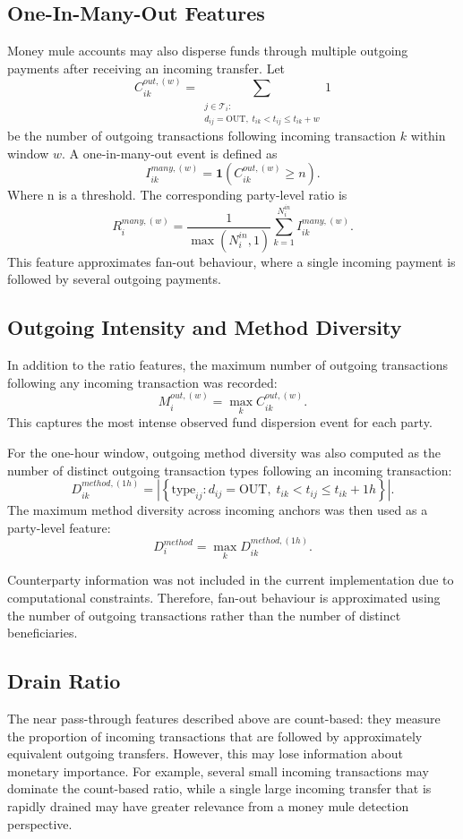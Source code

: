 \subsection{One-In-Many-Out Features}

Money mule accounts may also disperse funds through multiple outgoing payments after receiving an incoming transfer. Let
\[
C_{ik}^{out,(w)}
=
\sum_{\substack{j \in \mathcal{T}_i:\\
d_{ij}=\mathrm{OUT},\;
t_{ik}<t_{ij}\leq t_{ik}+w}}
1
\]
be the number of outgoing transactions following incoming transaction \(k\) within window \(w\). A one-in-many-out event is defined as
\[
I_{ik}^{many,(w)}
=
\mathbf{1}\left(C_{ik}^{out,(w)} \geq n\right).
\]
Where n is a threshold. The corresponding party-level ratio is
\[
R_i^{many,(w)}
=
\frac{1}{\max(N_i^{in},1)}
\sum_{k=1}^{N_i^{in}}
I_{ik}^{many,(w)}.
\]
This feature approximates fan-out behaviour, where a single incoming payment is followed by several outgoing payments.

\subsection{Outgoing Intensity and Method Diversity}

In addition to the ratio features, the maximum number of outgoing transactions following any incoming transaction was recorded:
\[
M_i^{out,(w)}
=
\max_k C_{ik}^{out,(w)}.
\]
This captures the most intense observed fund dispersion event for each party.

For the one-hour window, outgoing method diversity was also computed as the number of distinct outgoing transaction types following an incoming transaction:
\[
D_{ik}^{method,(1h)}
=
\left|
\left\{
\mathrm{type}_{ij}:
d_{ij}=\mathrm{OUT},
\;
t_{ik}<t_{ij}\leq t_{ik}+1h
\right\}
\right|.
\]
The maximum method diversity across incoming anchors was then used as a party-level feature:
\[
D_i^{method}
=
\max_k D_{ik}^{method,(1h)}.
\]

Counterparty information was not included in the current implementation due to computational constraints. Therefore, fan-out behaviour is approximated using the number of outgoing transactions rather than the number of distinct beneficiaries.
\subsection{Drain Ratio}

The near pass-through features described above are count-based: they measure the proportion of incoming transactions that are followed by approximately equivalent outgoing transfers. However, this may lose information about monetary importance. For example, several small incoming transactions may dominate the count-based ratio, while a single large incoming transfer that is rapidly drained may have greater relevance from a money mule detection perspective.


